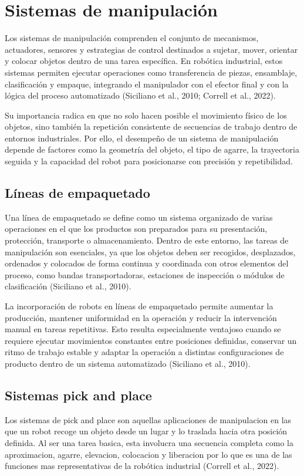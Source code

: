 \section{Sistemas de manipulación}
Los sistemas de manipulación comprenden el conjunto de mecanismos, actuadores, sensores y estrategias de control destinados a sujetar, mover, orientar y colocar objetos dentro de una tarea específica. En robótica industrial, estos sistemas permiten ejecutar operaciones como transferencia de piezas, ensamblaje, clasificación y empaque, integrando el manipulador con el efector final y con la lógica del proceso automatizado (Siciliano et al., 2010; Correll et al., 2022).

Su importancia radica en que no solo hacen posible el movimiento físico de los objetos, sino también la repetición consistente de secuencias de trabajo dentro de entornos industriales. Por ello, el desempeño de un sistema de manipulación depende de factores como la geometría del objeto, el tipo de agarre, la trayectoria seguida y la capacidad del robot para posicionarse con precisión y repetibilidad.

\subsection{Líneas de empaquetado}
Una línea de empaquetado se define como un sistema organizado de varias operaciones en el que los productos son preparados para su presentación, protección, transporte o almacenamiento. Dentro de este entorno, las tareas de manipulación son esenciales, ya que los objetos deben ser recogidos, desplazados, ordenados y colocados de forma continua y coordinada con otros elementos del proceso, como bandas transportadoras, estaciones de inspección o módulos de clasificación (Siciliano et al., 2010).

La incorporación de robots en líneas de empaquetado permite aumentar la producción, mantener uniformidad en la operación y reducir la intervención manual en tareas repetitivas. Esto resulta especialmente ventajoso cuando se requiere ejecutar movimientos constantes entre posiciones definidas, conservar un ritmo de trabajo estable y adaptar la operación a distintas configuraciones de producto dentro de un sistema automatizado (Siciliano et al., 2010).

\subsection{Sistemas pick and place}
Los sistemas de pick and place son aquellas aplicaciones de manipulacion en las que un robot recoge un objeto desde un lugar y lo traslada hacia otra posición definida. Al ser una tarea basica, esta involucra una secuencia completa como la aproximacion, agarre, elevacion, colocacion y liberacion por lo que es una de las funciones mas representativas de la robótica industrial (Correll et al., 2022).

